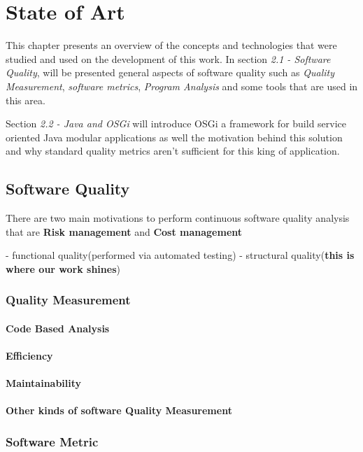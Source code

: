\chapter{State of Art}
This chapter presents an overview of the concepts and technologies that were studied and used on the development of this work. 
In section \textit{2.1 - Software Quality}, will be presented general aspects of software quality such as \textit{Quality Measurement},  \textit{software metrics}, \textit{Program Analysis} and some tools that are used in this area.  

Section \textit{2.2 - Java and OSGi} will introduce OSGi a framework for build service oriented Java modular applications as well the motivation 
behind this solution and why standard quality metrics aren't sufficient for this king of application. 


\section{Software Quality}



There are two main motivations to perform continuous software quality analysis that are \textbf{Risk management} and \textbf{Cost management}  


- functional quality(performed via automated testing)
- structural quality(\textbf{this is where our work shines})

\subsection{Quality Measurement}

\subsubsection{Code Based Analysis}
\subsubsection{Efficiency}
\subsubsection{Maintainability}
\subsubsection{Other kinds of software Quality Measurement}

\subsection{Software Metric}

